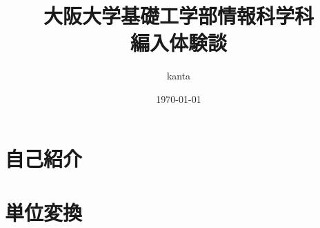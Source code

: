\documentclass[uplatex, dvipdfmx, fleqn, a4paper, 10pt]{ujreport}
\title{大阪大学基礎工学部情報科学科\\編入体験談}
\author{kanta}
\date{\today}
\begin{document}
\maketitle

\chapter{自己紹介}

\chapter{単位変換}

\chapter{}
\end{document}
